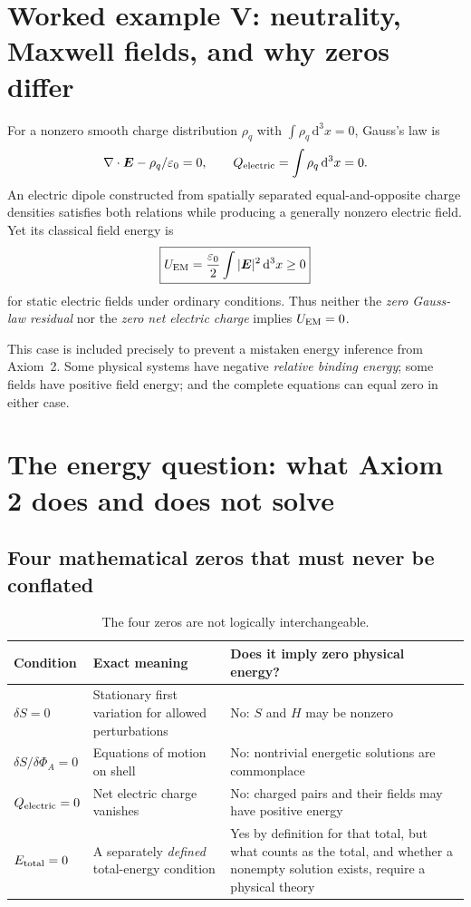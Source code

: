 \documentclass[11pt,a4paper]{article}
\newcommand{\dd}{\mathrm{d}}
\theoremstyle{tmon}
\theoremstyle{definition}
\begin{document}
\section{Worked example V: neutrality, Maxwell fields, and why zeros differ}
For a nonzero smooth charge distribution $\rho_q$ with $\int\rho_q\,\dd^3x=0$, Gauss's law is
\begin{equation}
\nabla\cdot\bm E-\rho_q/\varepsilon_0=0,
\qquad Q_{\rm electric}=\int\rho_q\,\dd^3x=0.
\end{equation}
An electric dipole constructed from spatially separated equal-and-opposite charge densities satisfies both relations while producing a generally nonzero electric field. Yet its classical field energy is
\begin{equation}\label{eq:Em}
\boxed{U_{\rm EM}=\frac{\varepsilon_0}{2}\int|\bm E|^2\,\dd^3x\ge0}
\end{equation}
for static electric fields under ordinary conditions. Thus neither the \emph{zero Gauss-law residual} nor the \emph{zero net electric charge} implies $U_{\rm EM}=0$.

This case is included precisely to prevent a mistaken energy inference from Axiom~2. Some physical systems have negative \emph{relative binding energy}; some fields have positive field energy; and the complete equations can equal zero in either case.

\section{The energy question: what Axiom 2 does and does not solve}
\subsection{Four mathematical zeros that must never be conflated}
\begin{table}[h]
\centering\small
\begin{tabularx}{\linewidth}{@{}p{.21\linewidth}p{.31\linewidth}Y@{}}\toprule
\textbf{Condition} & \textbf{Exact meaning} & \textbf{Does it imply zero physical energy?}\\\midrule
$\delta S=0$ & Stationary first variation for allowed perturbations & No: $S$ and $H$ may be nonzero\\
$\delta S/\delta\Phi_A=0$ & Equations of motion on shell & No: nontrivial energetic solutions are commonplace\\
$Q_{\rm electric}=0$ & Net electric charge vanishes & No: charged pairs and their fields may have positive energy\\
$E_{\rm total}=0$ & A separately \emph{defined} total-energy condition & Yes by definition for that total, but what counts as the total, and whether a nonempty solution exists, require a physical theory\\\bottomrule
\end{tabularx}
\caption{The four zeros are not logically interchangeable.}\label{tab:fourzeros}
\end{table}
\end{document}
